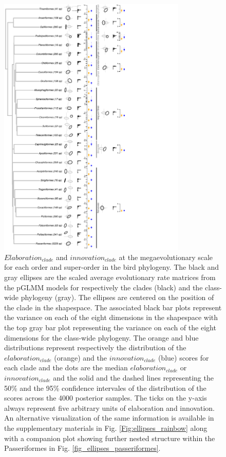 \documentclass[12pt,letterpaper]{article}
\begin{document}
\begin{figure}[!htbp]
\centering
   \includegraphics[width=0.8\textwidth]{Figures/figure_phylo_spiro_dark.pdf}
\caption{\scriptsize{$Elaboration_{clade}$ and $innovation_{clade}$ at the megaevolutionary scale for each order and super-order in the bird phylogeny.
The black and gray ellipses are the scaled average evolutionary rate matrices from the pGLMM models for respectively the clades (black) and the class-wide phylogeny (gray).
The ellipses are centered on the position of the clade in the shapespace.
The associated black bar plots represent the variance on each of the eight dimensions in the shapespace with the top gray bar plot representing the variance on each of the eight dimensions for the class-wide phylogeny.
The orange and blue distributions represent respectively the distribution of the $elaboration_{clade}$ (orange) and the $innovation_{clade}$ (blue) scores for each clade and the dots are the median $elaboration_{clade}$ or $innovation_{clade}$ and the solid and the dashed lines representing the 50\% and the 95\% confidence intervales of the distribution of the scores across the 4000 posterior samples.
The ticks on the y-axis always represent five arbitrary units of elaboration and innovation.
An alternative visualization of the same information is available in the supplementary materials in Fig. \ref{Fig:ellipses_rainbow} along with a companion plot showing further nested structure within the Passeriformes in Fig. \ref{fig_ellipses_passeriformes}.}
}
\label{Fig:ellipses}
\end{figure}
\bigskip
\end{document}
